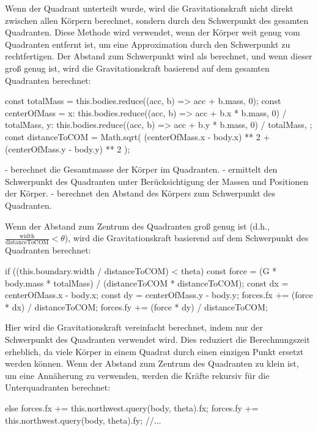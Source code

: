 \documentclass[a4paper,12pt,twoside]{article}
\begin{document}
Wenn der Quadrant unterteilt wurde, wird die Gravitationskraft nicht direkt zwischen allen Körpern berechnet, sondern durch den Schwerpunkt des gesamten Quadranten. Diese Methode wird verwendet, wenn der Körper weit genug vom Quadranten entfernt ist, um eine Approximation durch den Schwerpunkt zu rechtfertigen. Der Abstand zum Schwerpunkt wird als  berechnet, und wenn dieser groß genug ist, wird die Gravitationskraft basierend auf dem gesamten Quadranten berechnet:

\begin{javascript}
const totalMass = this.bodies.reduce((acc, b) => acc + b.mass, 0);
const centerOfMass = {
  x: this.bodies.reduce((acc, b) => acc + b.x * b.mass, 0) / totalMass,
  y: this.bodies.reduce((acc, b) => acc + b.y * b.mass, 0) / totalMass,
};
const distanceToCOM = Math.sqrt(
  (centerOfMass.x - body.x) ** 2 + (centerOfMass.y - body.y) ** 2
);
\end{javascript}

-  berechnet die Gesamtmasse der Körper im Quadranten.
-  ermittelt den Schwerpunkt des Quadranten unter Berücksichtigung der Massen und Positionen der Körper.
-  berechnet den Abstand des Körpers zum Schwerpunkt des Quadranten.

Wenn der Abstand zum Zentrum des Quadranten groß genug ist (d.h., \( \frac{\text{width}}{\text{distanceToCOM}} < \theta \)), wird die Gravitationskraft basierend auf dem Schwerpunkt des Quadranten berechnet:

\begin{javascript}
if ((this.boundary.width / distanceToCOM) < theta) {
    const force = (G * body.mass * totalMass) / (distanceToCOM * distanceToCOM);
    const dx = centerOfMass.x - body.x;
    const dy = centerOfMass.y - body.y;
    forces.fx += (force * dx) / distanceToCOM;
    forces.fy += (force * dy) / distanceToCOM;
}
\end{javascript}

Hier wird die Gravitationskraft vereinfacht berechnet, indem nur der Schwerpunkt des Quadranten verwendet wird. Dies reduziert die Berechnungszeit erheblich, da viele Körper in einem Quadrat durch einen einzigen Punkt ersetzt werden können.
Wenn der Abstand zum Zentrum des Quadranten zu klein ist, um eine Annäherung zu verwenden, werden die Kräfte rekursiv für die Unterquadranten berechnet:

\begin{javascript}
else {
    forces.fx += this.northwest.query(body, theta).fx;
    forces.fy += this.northwest.query(body, theta).fy;
    //...
}
\end{javascript}
\end{document}
